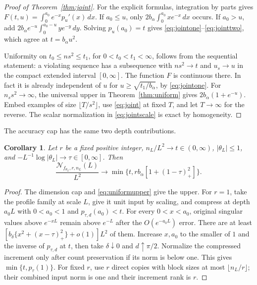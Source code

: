 \documentclass[11pt]{article}
\newtheorem{corollary}[theorem]{Corollary}
\numberwithin{equation}{section}
\newcommand{\cN}{\mathcal N}
\begin{document}
\begin{proof}[Proof of Theorem~\ref{thm:joint}]
For the explicit formulas, integration by parts gives
$F(t,u)=\int_0^{a_0}e^{-x}p_u'(x)\,dx$.
If $a_0\le u$, only $2b_\alpha\int_0^{a_0}xe^{-x}\,dx$ occurs.
If $a_0>u$, add
$2b_\alpha e^{-u}\int_0^{a_0-u}ye^{-y}\,dy$.
Solving $p_u(a_0)=t$ gives \eqref{eq:jointone}--\eqref{eq:jointtwo},
which agree at $t=b_\alpha u^2$.

Uniformity on $t_0\le n s^2\le t_1$, for $0<t_0<t_1<\infty$,
follows from the sequential statement: a violating sequence has a
subsequence with $n s^2\to t$ and $u_s\to u$ in the compact extended
interval $[0,\infty]$. The function $F$ is continuous there.
In fact it is already independent of $u$ for
$u\ge\sqrt{t_1/b_\alpha}$, by \eqref{eq:jointone}.
For $n_s s^2\to\infty$, the universal upper in
Theorem~\ref{thm:uniform} gives $2b_\alpha(1+e^{-u})$.
Embed examples of size $\lfloor T/s^2\rfloor$, use
\eqref{eq:joint} at fixed $T$, and let $T\to\infty$ for the reverse.
The scalar normalization in \eqref{eq:jointscale} is exact by
homogeneity.
\end{proof}

The accuracy cap has the same two depth contributions.
\begin{corollary}\label{cor:jointcounts}
Let $r$ be a fixed positive integer, $n_L/L^2\to t\in(0,\infty)$,
$|\theta_L|\le1$, and $-L^{-1}\log|\theta_L|\to\tau\in[0,\infty]$.
Then
\begin{equation}\label{eq:jointcounts}
 \frac{\cN_{f_{\theta_L},r,n_L}(L)}{L^2}
 \longrightarrow\min\{t,r b_\alpha[1+(1-\tau)_+^2]\}.
\end{equation}
\end{corollary}
\begin{proof}
The dimension cap and \eqref{eq:uniformupper} give the upper.
For $r=1$, take the profile family at scale $L$, give it unit input
by scaling, and compress at depth $a_0L$ with $0<a_0<1$ and
$p_{\tau,d}(a_0)<t$. For every $0<x<a_0$, original singular values
above $e^{-xL}$ remain above $e^{-L}$ after the $O(e^{-a_0L})$ error.
There are at least
$[b_\delta\{x^2+(x-\tau)_+^2\}+o(1)]L^2$ of them.
Increase $x,a_0$ to the smaller of $1$ and the inverse of
$p_{\tau,d}$ at $t$, then take $\delta\downarrow0$ and
$d\uparrow\pi/2$. Normalize the compressed increment only after
count preservation if its norm is below one. This gives
$\min\{t,p_\tau(1)\}$. For fixed $r$, use $r$ direct copies with
block sizes at most $\lfloor n_L/r\rfloor$; their combined input
norm is one and their increment rank is $r$.
\end{proof}
\end{document}
